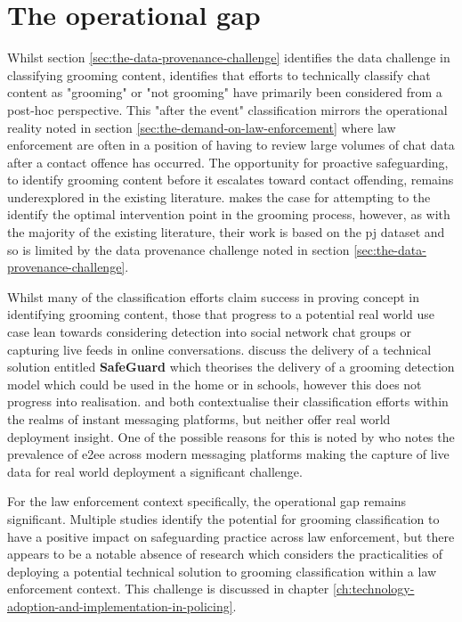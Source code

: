 \documentclass[12pt,a4paper,oneside]{report}
\begin{document}
\section{The operational gap}
\label{sec:the-operational-gap}
Whilst section \ref{sec:the-data-provenance-challenge} identifies the data challenge in classifying grooming content, \citet{an2025revisiting} identifies that efforts to technically classify chat content as "grooming" or "not grooming" have primarily been considered from a post-hoc perspective.  This "after the event" classification mirrors the operational reality noted in section \ref{sec:the-demand-on-law-enforcement} where law enforcement are often in a position of having to review large volumes of chat data after a contact offence has occurred.  The opportunity for proactive safeguarding, to identify grooming content before it escalates toward contact offending, remains underexplored in the existing literature.  \citet{an2025revisiting} makes the case for attempting to the identify the optimal intervention point in the grooming process, however, as with the majority of the existing literature, their work is based on the \gls{pj} dataset and so is limited by the data provenance challenge noted in section \ref{sec:the-data-provenance-challenge}.

Whilst many of the classification efforts claim success in proving concept in identifying grooming content, those that progress to a potential real world use case lean towards considering detection into social network chat groups or capturing live feeds in online conversations.  \citet{s.e.abdelhamid2026detection} discuss the delivery of a technical solution entitled \textbf{SafeGuard} which theorises the delivery of a grooming detection model which could be used in the home or in schools, however this does not progress into realisation.  \citet{agarwal2022predatory} and \cite{xiao2025adapting} both contextualise their classification efforts within the realms of instant messaging platforms, but neither offer real world deployment insight.  One of the possible reasons for this is noted by \citet{street2025enhanced} who notes the prevalence of \gls{e2ee} across modern messaging platforms making the capture of live data for real world deployment a significant challenge.  

For the law enforcement context specifically, the operational gap remains significant.  Multiple studies identify the potential for grooming classification to have a positive impact on safeguarding practice across law enforcement, \citep{inches2012overview,agarwal2022predatory,hamm2025comparing} but there appears to be a notable absence of research which considers the practicalities of deploying a potential technical solution to grooming classification within a law enforcement context.  This challenge is discussed in chapter \ref{ch:technology-adoption-and-implementation-in-policing}.
\end{document}
